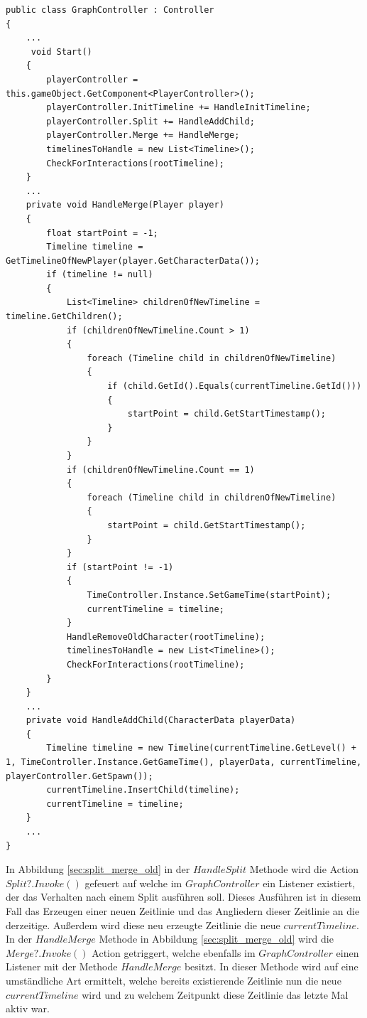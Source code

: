 \begin{lstlisting}[caption={Split und Merge listener}, label={sec:split_merge_old_graph}]
public class GraphController : Controller
{
    ...
     void Start()
    {
        playerController = this.gameObject.GetComponent<PlayerController>();
        playerController.InitTimeline += HandleInitTimeline;
        playerController.Split += HandleAddChild;
        playerController.Merge += HandleMerge;
        timelinesToHandle = new List<Timeline>();
        CheckForInteractions(rootTimeline);
    }
    ...
    private void HandleMerge(Player player)
    {
        float startPoint = -1;
        Timeline timeline = GetTimelineOfNewPlayer(player.GetCharacterData());
        if (timeline != null)
        {
            List<Timeline> childrenOfNewTimeline = timeline.GetChildren();
            if (childrenOfNewTimeline.Count > 1)
            {
                foreach (Timeline child in childrenOfNewTimeline)
                {
                    if (child.GetId().Equals(currentTimeline.GetId()))
                    {
                        startPoint = child.GetStartTimestamp();
                    }
                }
            }
            if (childrenOfNewTimeline.Count == 1)
            {
                foreach (Timeline child in childrenOfNewTimeline)
                {
                    startPoint = child.GetStartTimestamp();
                }
            }
            if (startPoint != -1)
            {
                TimeController.Instance.SetGameTime(startPoint);
                currentTimeline = timeline;
            }
            HandleRemoveOldCharacter(rootTimeline);
            timelinesToHandle = new List<Timeline>();
            CheckForInteractions(rootTimeline);
        }
    }
    ...
    private void HandleAddChild(CharacterData playerData)
    {
        Timeline timeline = new Timeline(currentTimeline.GetLevel() + 1, TimeController.Instance.GetGameTime(), playerData, currentTimeline, playerController.GetSpawn());
        currentTimeline.InsertChild(timeline);
        currentTimeline = timeline;
    }
    ...
}
\end{lstlisting}

In Abbildung \ref{sec:split_merge_old} in der $HandleSplit$ Methode wird die Action $Split?.Invoke()$ gefeuert auf welche im $GraphController$ ein Listener existiert, der das Verhalten nach einem Split ausführen soll. Dieses Ausführen ist in diesem Fall das Erzeugen einer neuen Zeitlinie und das Angliedern dieser Zeitlinie an die derzeitige. Außerdem wird diese neu erzeugte Zeitlinie die neue $currentTimeline$.
In der $HandleMerge$ Methode in Abbildung \ref{sec:split_merge_old} wird die $Merge?.Invoke()$ Action getriggert, welche ebenfalls im $GraphController$ einen Listener mit der Methode $HandleMerge$ besitzt. In dieser Methode wird auf eine umständliche Art ermittelt, welche bereits existierende Zeitlinie nun die neue $currentTimeline$ wird und zu welchem Zeitpunkt diese Zeitlinie das letzte Mal aktiv war. 

